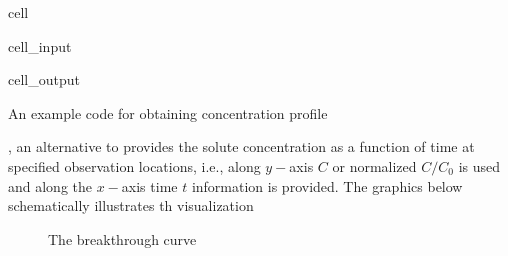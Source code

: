 \documentclass[letterpaper,10pt,english]{jupyterBook}
\begin{document}
\begin{sphinxuseclass}{cell}
\begin{sphinxVerbatimInput}
\begin{sphinxuseclass}{cell_input}
\begin{sphinxVerbatim}[commandchars=\\\{\}]
 
\end{sphinxVerbatim}

\end{sphinxuseclass}\end{sphinxVerbatimInput}
\begin{sphinxVerbatimOutput}

\begin{sphinxuseclass}{cell_output}
\begin{sphinxVerbatim}[commandchars=\\\{\}]
An example code for obtaining concentration profile 
\end{sphinxVerbatim}

\noindent{}

\end{sphinxuseclass}\end{sphinxVerbatimOutput}

\end{sphinxuseclass}
\sphinxAtStartPar
{}, an alternative to  provides the solute concentration as a function of time at specified observation locations, i.e., along \(y-\)axis \(C\) or normalized \(C/C_0\) is used and along the \(x-\)axis time \(t\) information is provided. The graphics below schematically illustrates th  visualization

\begin{figure}[htbp]
\centering
\capstart

\noindent{}
\caption{The break\sphinxhyphen{}through curve}\label{\detokenize{content/transport/L9/21_conservative_transport:break}}\end{figure}
\end{document}
